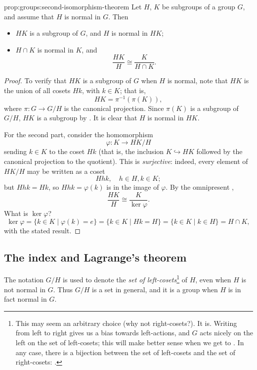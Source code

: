 \begin{prop}{}{prop:groups:second-isomorphism-theorem}
  Let $H$, $K$ be subgroups of a group $G$, and assume that
$H$ is normal in $G$. Then
\begin{itemize}
\item $HK$ is a subgroup of $G$, and $H$ is normal in $HK$;
\item $H \cap K$ is normal in $K$, and
\[
  \frac{HK}{H} \cong \frac{K}{H \cap K}.
\]
\end{itemize}
\end{prop}
\begin{proof}
  To verify that $HK$ is a subgroup of $G$ when $H$ is normal, note
  that $HK$ is the union of all cosets $Hk$, with $k \in K$; that is,
  \[
    HK = \pi^{-1}(\pi(K)),
  \]
  where $\pi : G \to G/H$ is the canonical projection. Since $\pi(K)$
  is a subgroup of $G/H$, $HK$ is a subgroup by
  . It is clear that $H$ is
  normal in $HK$.

  For the second part, consider the homomorphism
  \[
    \varphi : K \to HK/H
  \]
  sending $k \in K$ to the coset $Hk$ (that is, the inclusion
  $K \hookrightarrow HK$ followed by the canonical projection to the
  quotient). This is \emph{surjective}: indeed, every element of
  $HK/H$ may be written as a coset
  \[
    Hhk, \quad h \in H, k \in K;
  \]
  but $Hhk = Hk$, so $Hhk = \varphi(k)$ is in the image of
  $\varphi$. By the omnipresent
  ,
  \[
    \frac{HK}{H} \cong \frac{K}{\ker\varphi}.
  \]
  What is $\ker\varphi$?
  \[
    \ker\varphi = \{k \in K \mid \varphi(k) = e\} = \{k \in K \mid Hk
    = H\} = \{k \in K \mid k \in H\} = H \cap K,
  \]
  with the stated result.
\end{proof}

\subsection{The index and Lagrange's theorem}
\label{subsec:groups:the-index-and-lagrange-s-theorem}

The notation $G/H$ is used to denote the \emph{set of
  left-cosets}\footnote{This may seem an arbitrary choice (why not
  right-cosets?). It is. Writing from left to right gives us a bias
  towards left-actions, and $G$ acts nicely on the left on the set of
  left-cosets; this will make better sense when we get to
  . In any case, there is a
  bijection between the set of left-cosets and the set of
  right-cosets: .} of
$H$, even when $H$ is not normal in $G$. Thus $G/H$ is a set in
general, and it is a group when $H$ is in fact normal in $G$.

